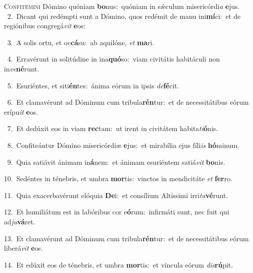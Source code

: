 \lettrine{\initial\textcolor{\initialcolor}{C}}{onfitémini} Dómino quóniam \textbf{bo}\-nus:~\star quóniam in sǽculum misericórdi\textit{a} \textbf{e}\-jus.\\
{\numbfont\textcolor{\numbcolor}{~2.}}~Dicant qui redémpti sunt a Dómino, quos redémit de manu ini\-\textbf{mí}\-ci:~\star et de regiónibus congregá\textit{vit} \textbf{e}\-os:\par
{\numbfont\textcolor{\numbcolor}{~3.}}~A solis ortu, et oc\-\textbf{cá}\-su:~\star ab aquilóne, \textit{et} \textbf{ma}\-ri.\par
{\numbfont\textcolor{\numbcolor}{~4.}}~Erravérunt in solitúdine in ina\-\textbf{quó}\-so:~\star viam civitátis habitáculi non in\-\textit{ve}\-\textbf{né}runt.\par
{\numbfont\textcolor{\numbcolor}{~5.}}~Esuriéntes, et siti\-\textbf{én}\-tes:~\star ánima eórum in ipsis \textit{de}\-\textbf{fé}cit.\par
{\numbfont\textcolor{\numbcolor}{~6.}}~Et clamavérunt ad Dóminum cum tribula\-\textbf{rén}\-tur:~\star et de necessitátibus eórum erípu\textit{it} \textbf{e}\-os.\par
{\numbfont\textcolor{\numbcolor}{~7.}}~Et dedúxit eos in viam \textbf{rec}\-tam:~\star ut irent in civitátem habita\-\textit{ti}\-\textbf{ó}nis.\par
{\numbfont\textcolor{\numbcolor}{~8.}}~Confiteántur Dómino misericórdiæ \textbf{e}\-jus:~\star et mirabília ejus fíli\textit{is} \textbf{hó}\-minum.\par
{\numbfont\textcolor{\numbcolor}{~9.}}~Quia satiávit ánimam in\-\textbf{á}\-nem:~\star et ánimam esuriéntem satiá\textit{vit} \textbf{bo}\-nis.\par
{\numbfont\textcolor{\numbcolor}{10.}}~Sedéntes in ténebris, et umbra \textbf{mor}\-tis:~\star vinctos in mendicitáte \textit{et} \textbf{fer}\-ro.\par
{\numbfont\textcolor{\numbcolor}{11.}}~Quia exacerbavérunt elóquia \textbf{De}\-i:~\star et consílium Altíssimi irri\-\textit{ta}\-\textbf{vé}runt.\par
{\numbfont\textcolor{\numbcolor}{12.}}~Et humiliátum est in labóribus cor e\-\textbf{ó}\-rum:~\star infirmáti sunt, nec fuit qui ad\-\textit{ju}\-\textbf{vá}ret.\par
{\numbfont\textcolor{\numbcolor}{13.}}~Et clamavérunt ad Dóminum cum tribula\-\textbf{rén}\-tur:~\star et de necessitátibus eórum liberá\textit{vit} \textbf{e}\-os.\par
{\numbfont\textcolor{\numbcolor}{14.}}~Et edúxit eos de ténebris, et umbra \textbf{mor}\-tis:~\star et víncula eórum \textit{dis}\-\textbf{rú}pit.\par
